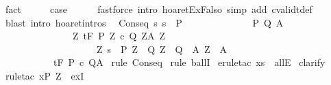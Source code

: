 \begin{isabellebody}
\ fact{\isacharplus}\isanewline
\ \ \isamarkupfalse%
\ \isamarkupfalse%
\ {\isacharquery}case\isanewline
\ \ \ \ \isamarkupfalse%
\ {\isacharparenleft}fastforce\ intro{\isacharcolon}\ hoaret{\isachardot}ExFalso\ simp\ add{\isacharcolon}\ cvalidt{\isacharunderscore}def{\isacharparenright}\isanewline
{}\isamarkupfalse%
\ {\isacharparenleft}blast\ intro{\isacharcolon}\ hoaret{\isachardot}intros{\isacharparenright}{\isacharplus}%
\endisatagproof
{\isafoldproof}%
%
\isadelimproof
%
\endisadelimproof
%
\isamarkuptrue%
\isamarkupfalse%
\ \ Conseq{\isacharprime}{\isacharcolon}\ {\isachardoublequoteopen}{\isasymforall}s{\isachardot}\ s\ {\isasymin}\ P\ {\isasymlongrightarrow}\ \isanewline
\ \ \ \ \ \ \ \ \ \ \ \ {\isacharparenleft}{\isasymexists}P{\isacharprime}\ Q{\isacharprime}\ A{\isacharprime}{\isachardot}\ \isanewline
\ \ \ \ \ \ \ \ \ \ \ \ \ \ {\isacharparenleft}{\isasymforall}\ Z{\isachardot}\ {\isasymGamma}{\isacharcomma}{\isasymTheta}{\isasymturnstile}\isactrlsub t\isactrlbsub {\isacharslash}F\isactrlesub \ {\isacharparenleft}P{\isacharprime}\ Z{\isacharparenright}\ c\ {\isacharparenleft}Q{\isacharprime}\ Z{\isacharparenright}{\isacharcomma}{\isacharparenleft}A{\isacharprime}\ Z{\isacharparenright}{\isacharparenright}\ {\isasymand}\isanewline
\ \ \ \ \ \ \ \ \ \ \ \ \ \ \ \ \ \ \ \ {\isacharparenleft}{\isasymexists}Z{\isachardot}\ s\ {\isasymin}\ P{\isacharprime}\ Z\ {\isasymand}\ {\isacharparenleft}Q{\isacharprime}\ Z\ {\isasymsubseteq}\ Q{\isacharparenright}\ {\isasymand}\ {\isacharparenleft}A{\isacharprime}\ Z\ {\isasymsubseteq}\ A{\isacharparenright}{\isacharparenright}{\isacharparenright}\isanewline
\ \ \ \ \ \ \ \ \ \ \ {\isasymLongrightarrow}\isanewline
\ \ \ \ \ \ \ \ \ \ \ {\isasymGamma}{\isacharcomma}{\isasymTheta}{\isasymturnstile}\isactrlsub t\isactrlbsub {\isacharslash}F\isactrlesub \ P\ c\ Q{\isacharcomma}A{\isachardoublequoteclose}\isanewline
%
\isadelimproof
%
\endisadelimproof
%
\isatagproof
{}\isamarkupfalse%
\ {\isacharparenleft}rule\ Conseq{\isacharparenright}\isanewline
{}\isamarkupfalse%
\ {\isacharparenleft}rule\ ballI{\isacharparenright}\isanewline
{}\isamarkupfalse%
\ {\isacharparenleft}erule{\isacharunderscore}tac\ x{\isacharequal}s\ \ allE{\isacharparenright}\isanewline
{}\isamarkupfalse%
\ {\isacharparenleft}clarify{\isacharparenright}\isanewline
{}\isamarkupfalse%
\ {\isacharparenleft}rule{\isacharunderscore}tac\ x{\isacharequal}{\isachardoublequoteopen}P{\isacharprime}\ Z{\isachardoublequoteclose}\ \ exI{\isacharparenright}\isanewline

\end{isabellebody}
